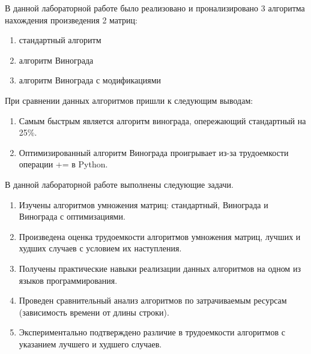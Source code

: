\Conclusion %

 В данной лабораторной работе было реализовано и пронализировано 3 алгоритма нахождения произведения 2 матриц:
	\begin{enumerate}
	 	\item стандартный алгоритм 
		\item алгоритм Винограда
		\item алгоритм Винограда с модификациями 
	\end{enumerate}

При сравнении данных алгоритмов пришли к следующим выводам:
	\begin{enumerate}
 		\item Самым быстрым  является алгоритм винограда, опережающий стандартный на 25\%. 
 		\item Оптимизированный алгоритм Винограда проигрывает из-за трудоемкости операции += в Python. 
	\end{enumerate}

	В данной лабораторной работе выполнены следующие задачи. 
        \begin{enumerate} 
		\item Изучены алгоритмов умножения матриц: стандартный, Винограда и Винограда с оптимизациями. 
		\item Произведена оценка трудоемкости алгоритмов умножения матриц, лучших и худших случаев с условием их наступления. 
		\item Получены практические навыки реализации данных алгоритмов на одном из языков программирования. 
		\item Проведен сравнительный анализ алгоритмов по затрачиваемым ресурсам (зависимость времени от длины строки). 
		\item Экспериментально подтверждено различие в трудоемкости алгоритмов с указанием лучшего и худшего случаев. 
	\end{enumerate}
